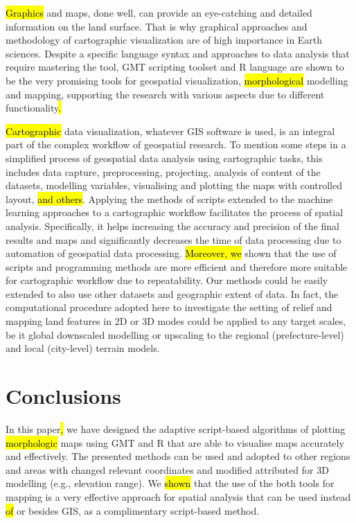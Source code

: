 \documentclass[land,article,submit,pdftex,moreauthors]{Definitions/mdpi}
\begin{document}
\hl{Graphics} and maps, done well, can provide an eye-catching and detailed information on the land surface. That is why graphical approaches and methodology of cartographic visualization are of high importance in Earth sciences. Despite a specific language syntax and approaches to data analysis that require mastering the tool, GMT scripting toolset and R language are shown to be the very promising tools for geospatial visualization, \hl{morphological} modelling and mapping, supporting the research with various aspects due to different functionality\hl{.} 

\hl{Cartographic} data visualization, whatever GIS software is used, is an integral part of the complex workflow of geospatial research. To mention some steps in a simplified process of geospatial data analysis using cartographic tasks, this includes data capture, preprocessing, projecting, analysis of content of the datasets, modelling variables, visualising and plotting the maps with controlled layout, \hl{and others}. Applying the methods of scripts extended to the machine learning approaches to a cartographic workflow facilitates the process of spatial analysis. Specifically, it helps increasing the accuracy and precision of the final results and maps and significantly decreases the time of data processing due to automation of geospatial data processing. \hl{Moreover, we} shown that the use of scripts and programming methods are more efficient and therefore more suitable for cartographic workflow due to\hl{ }repeatability. Our methods could be easily extended to also use other datasets and geographic extent of data. In fact, the computational procedure adopted here to investigate the setting of relief and mapping land features in 2D or 3D modes could be applied to any target scales, be it global downscaled modelling or upscaling to the regional (prefecture-level) and local (city-level)  terrain models. 


\section{Conclusions}

In this paper\hl{, }we have designed the adaptive script-based algorithms of plotting \hl{morphologic} maps using GMT and R that are able to visualise maps accurately and effectively. The presented methods can be used and adopted to other regions and areas with changed relevant coordinates and modified attributed for 3D modelling (e.g., elevation range). We \hl{shown} that the use of the both tools for mapping is a very effective approach for spatial analysis that can be used instead \hl{of }or besides GIS, as a complimentary script-based method. 
\end{document}
